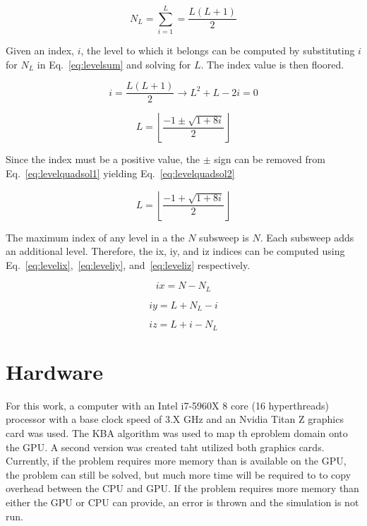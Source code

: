 \begin{equation} \label{eq:levelsum}
N_L = \sum_{i=1}^{L} = \frac{L(L+1)}{2}
\end{equation}

Given an index, $i$, the level to which it belongs can be computed by substituting $i$ for $N_L$ in Eq.~\ref{eq:levelsum} and solving for $L$. The index value is then floored.

\begin{equation} \label{eq:levelquadratic}
i = \frac{L(L+1)}{2} \rightarrow L^2 + L - 2i = 0
\end{equation}

\begin{equation} \label{eq:levelquadsol1}
L = \left \lfloor{\frac{-1 \pm \sqrt{1+8i}}{2}} \right \rfloor
\end{equation}

Since the index must be a positive value, the $\pm$ sign can be removed from Eq.~\ref{eq:levelquadsol1} yielding Eq.~\ref{eq:levelquadsol2}

\begin{equation} \label{eq:levelquadsol2}
L = \left \lfloor{\frac{-1 + \sqrt{1+8i}}{2}} \right \rfloor
\end{equation}

The maximum index of any level in a the $N$ subsweep is $N$. Each subsweep adds an additional level. Therefore, the ix, iy, and iz indices can be computed using Eq.~\ref{eq:levelix},~\ref{eq:leveliy}, and~\ref{eq:leveliz} respectively.

\begin{equation} \label{eq:levelix}
ix = N - N_L
\end{equation}

\begin{equation} \label{eq:leveliy}
iy = L + N_L - i
\end{equation}

\begin{equation} \label{eq:leveliz}
iz = L + i - N_L
\end{equation}


\section{Hardware}
For this work, a computer with an Intel i7-5960X 8 core (16 hyperthreads) processor with a base clock speed of 3.X GHz and an Nvidia Titan Z graphics card was used. The KBA algorithm was used to map th eproblem domain onto the GPU. A second version was created taht utilized both graphics cards. Currently, if the problem requires more memory than is available on the GPU, the problem can still be solved, but much more time will be required to to copy overhead between the CPU and GPU. If the problem requires more memory than either the GPU or CPU can provide, an error is thrown and the simulation is not run.


